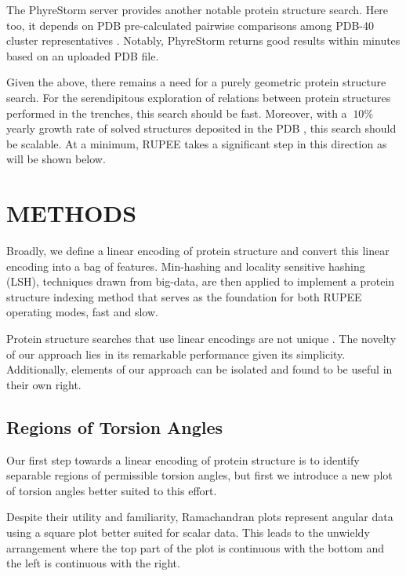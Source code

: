 \documentclass[a4,center,fleqn]{NAR}
\begin{document}
The PhyreStorm server \cite{Mezulis2016} provides another notable protein structure search.
Here too, it depends on PDB pre-calculated pairwise comparisons among PDB-40 cluster representatives \cite{Prlic2010}. 
Notably, PhyreStorm returns good results within minutes based on an uploaded PDB file. 

Given the above, there remains a need for a purely geometric protein structure search.
For the serendipitous exploration of relations between protein structures performed in the trenches, this search should be fast. 
Moreover, with a $~10\%$ yearly growth rate of solved structures deposited in the PDB \cite{gkw1000}, this search should be scalable. 
At a minimum, RUPEE takes a significant step in this direction as will be shown below. 

\section{METHODS}

Broadly, we define a linear encoding of protein structure and convert this linear encoding into a bag of features. 
Min-hashing and locality sensitive hashing (LSH), techniques drawn from big-data, are then applied to implement a protein structure indexing method that serves as the foundation for both RUPEE operating modes, fast and slow. 

Protein structure searches that use linear encodings are not unique \cite{Carpentier2005,Daniluk2011,Ritchie2012}.
The novelty of our approach lies in its remarkable performance given its simplicity. 
Additionally, elements of our approach can be isolated and found to be useful in their own right. 

\subsection{Regions of Torsion Angles}

Our first step towards a linear encoding of protein structure is to identify separable regions of permissible torsion angles,
but first we introduce a new plot of torsion angles better suited to this effort. 


Despite their utility and familiarity, Ramachandran plots \cite{Ramachandran1968} represent angular data using a square plot better suited for scalar data.
This leads to the unwieldy arrangement where the top part of the plot is continuous with the bottom and the left is continuous with the right. 
\end{document}
